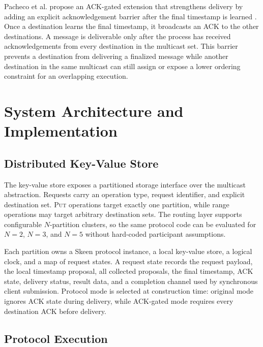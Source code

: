\documentclass[conference]{IEEEtran}
\begin{document}
Pacheco et al. propose an ACK-gated extension that strengthens delivery by adding an explicit acknowledgement barrier after the final timestamp is learned \cite{pacheco}. Once a destination learns the final timestamp, it broadcasts an \textsc{ACK} to the other destinations. A message is deliverable only after the process has received acknowledgements from every destination in the multicast set. This barrier prevents a destination from delivering a finalized message while another destination in the same multicast can still assign or expose a lower ordering constraint for an overlapping execution.

\section{System Architecture and Implementation}

\subsection{Distributed Key-Value Store}

The key-value store exposes a partitioned storage interface over the multicast abstraction. Requests carry an operation type, request identifier, and explicit destination set. \textsc{Put} operations target exactly one partition, while range operations may target arbitrary destination sets. The routing layer supports configurable $N$-partition clusters, so the same protocol code can be evaluated for $N=2$, $N=3$, and $N=5$ without hard-coded participant assumptions.












Each partition owns a Skeen protocol instance, a local key-value store, a logical clock, and a map of request states. A request state records the request payload, the local timestamp proposal, all collected proposals, the final timestamp, ACK state, delivery status, result data, and a completion channel used by synchronous client submission. Protocol mode is selected at construction time: original mode ignores ACK state during delivery, while ACK-gated mode requires every destination ACK before delivery.

\subsection{Protocol Execution}
\end{document}
